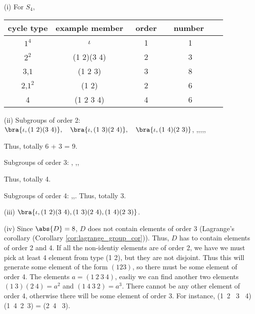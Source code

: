 \begin{solution}[\bf Solution.]
\ben
\item [(i)] For $S_4$,
\begin{table}[h!]
\centering
\begin{tabular}{ccccc}
\hline
cycle type & example member & \ order\  & \  number \  \\
\hline
$1^4$ & $\iota$ & 1 & 1 \\
$2^2$ & (1 2)(3 4) & 2 & 3\\
3,$1$ & (1 2 3) & 3 & 8 \\
2,$1^2$ & (1 2) & 2 & 6 \\
4 & (1 2 3 4) & 4 & 6 \\
\hline
\end{tabular}
\end{table}

\item [(ii)] Subgroups of order 2: $\bra{\iota, (1\ 2)(3\ 4)}, \quad \bra{\iota, (1\ 3)(2\ 4)},\quad \bra{\iota, (1\ 4)(2\ 3)}$,
\be
{},\quad {},\quad {},\quad {},\quad {},\quad {}
\ee

Thus, totally 6 + 3 = 9.

Subgroups of order 3:
\be
{}, \quad {},\quad {},\quad {}
\ee

Thus, totally 4.

Subgroups of order 4:
\be
{},\quad {},\quad {}.
\ee
Thus, totally 3.

\item [(iii)] $\bra{\iota, (1\ 2)(3\ 4),(1\ 3)(2\ 4),(1\ 4)(2\ 3)}$.
\item [(iv)] Since $\abs{D} = 8$, $D$ does not contain elements of order 3 (Lagrange's corollary (Corollary \ref{cor:lagrange_group_cor})). Thus, $D$ has to contain elements of order 2 and 4. If all the non-identiy elements are of order 2, we have we must pick at least 4 element from type (1 2), but they are not disjoint. Thus this will generate some element of the form $(1 2 3)$, so there must be some element of order 4. The elements $a = (1\ 2\ 3\ 4)$, easliy we can find another two elements $(1 \ 3)(2\ 4) = a^2$ and $(1\ 4\ 3 \ 2) = a^3$. There cannot be any other element of order 4, otherwise there will be some element of order 3. For instance,
\be
(1\ 2 \ 3 \ 4)(1\ 4\ 2\ 3) = (2\ 4 \ 3).
\ee


\end{solution}
